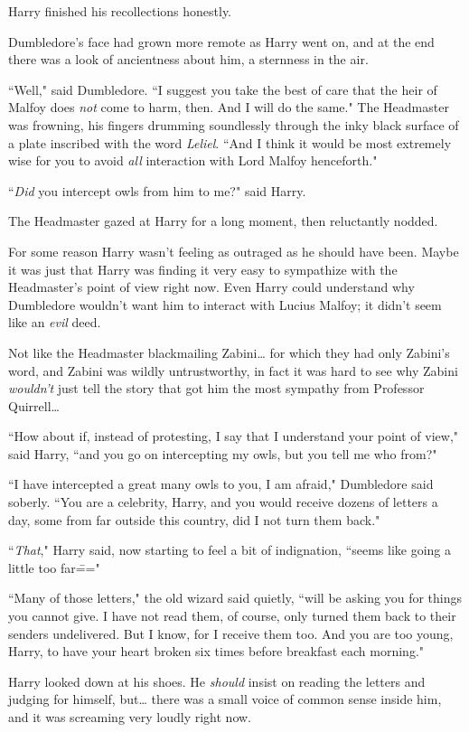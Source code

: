 Harry finished his recollections honestly.

Dumbledore's face had grown more remote as Harry went on, and at the end there was a look of ancientness about him, a sternness in the air.

``Well," said Dumbledore. ``I suggest you take the best of care that the heir of Malfoy does \emph{not} come to harm, then. And I will do the same." The Headmaster was frowning, his fingers drumming soundlessly through the inky black surface of a plate inscribed with the word \emph{Leliel}. ``And I think it would be most extremely wise for you to avoid \emph{all} interaction with Lord Malfoy henceforth."

``\emph{Did} you intercept owls from him to me?" said Harry.

The Headmaster gazed at Harry for a long moment, then reluctantly nodded.

For some reason Harry wasn't feeling as outraged as he should have been. Maybe it was just that Harry was finding it very easy to sympathize with the Headmaster's point of view right now. Even Harry could understand why Dumbledore wouldn't want him to interact with Lucius Malfoy; it didn't seem like an \emph{evil} deed.

Not like the Headmaster blackmailing Zabini{\ldots} for which they had only Zabini's word, and Zabini was wildly untrustworthy, in fact it was hard to see why Zabini \emph{wouldn't} just tell the story that got him the most sympathy from Professor Quirrell{\ldots}

``How about if, instead of protesting, I say that I understand your point of view," said Harry, ``and you go on intercepting my owls, but you tell me who from?"

``I have intercepted a great many owls to you, I am afraid," Dumbledore said soberly. ``You are a celebrity, Harry, and you would receive dozens of letters a day, some from far outside this country, did I not turn them back."

``\emph{That}," Harry said, now starting to feel a bit of indignation, ``seems like going a little too far\==="

``Many of those letters," the old wizard said quietly, ``will be asking you for things you cannot give. I have not read them, of course, only turned them back to their senders undelivered. But I know, for I receive them too. And you are too young, Harry, to have your heart broken six times before breakfast each morning."

Harry looked down at his shoes. He \emph{should} insist on reading the letters and judging for himself, but{\ldots} there was a small voice of common sense inside him, and it was screaming very loudly right now.


